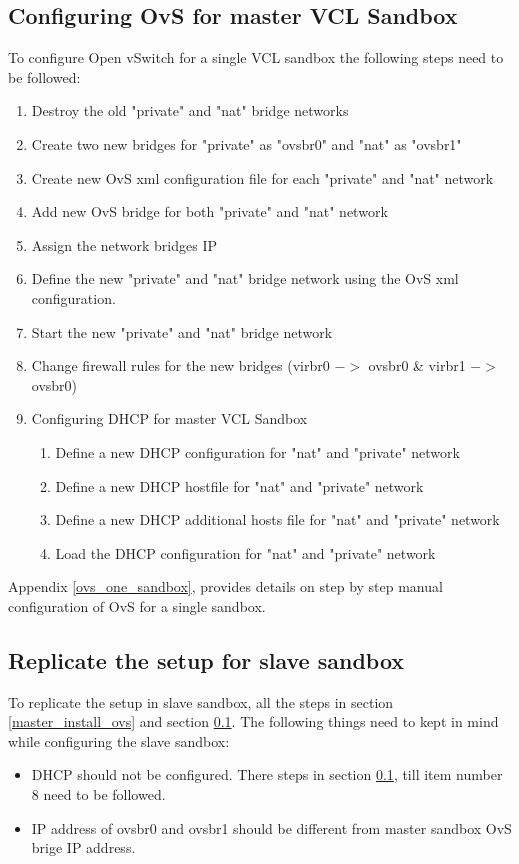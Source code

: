 \documentclass[12pt]{extarticle}
\begin{document}
\subsection{Configuring OvS for master VCL Sandbox} \label{master_configure_vcl}
To configure Open vSwitch for a single VCL sandbox the following steps need to be followed: 
\begin{enumerate}
    \item Destroy the old "private" and "nat" bridge networks
    \item Create two new bridges for "private" as "ovsbr0" and "nat" as "ovsbr1"
    \item Create new OvS xml configuration file for each "private" and "nat" network
    \item Add new OvS bridge for both "private" and "nat" network
    \item Assign the network bridges IP 
    \item Define the new "private" and "nat" bridge network using the OvS xml configuration. 
    \item Start the new "private" and "nat" bridge network
    \item Change firewall rules for the new bridges (virbr0 $->$ ovsbr0 \& virbr1 $->$ ovsbr0)
    \item Configuring DHCP for master VCL Sandbox
    \begin{enumerate}
    \item Define a new DHCP configuration for "nat" and "private" network
    \item Define a new DHCP hostfile for "nat" and "private" network
    \item Define a new DHCP additional hosts file for "nat" and "private" network
    \item Load the DHCP configuration for "nat" and "private" network
    \end{enumerate}
\end{enumerate}

Appendix \ref{ovs_one_sandbox}, provides details on step by step manual configuration of OvS for a single sandbox.

\subsection{Replicate the setup for slave sandbox} 
To replicate the setup in slave sandbox, all the steps in section \ref{master_install_ovs} and section \ref{master_configure_vcl}. The following things need to kept in mind while configuring the slave sandbox:
\begin{itemize}
    \item DHCP should not be configured. There steps in section \ref{master_configure_vcl}, till item number 8 need to be followed.
    \item IP address of ovsbr0 and ovsbr1 should be different from master sandbox OvS brige IP address.
\end{itemize}
\end{document}
